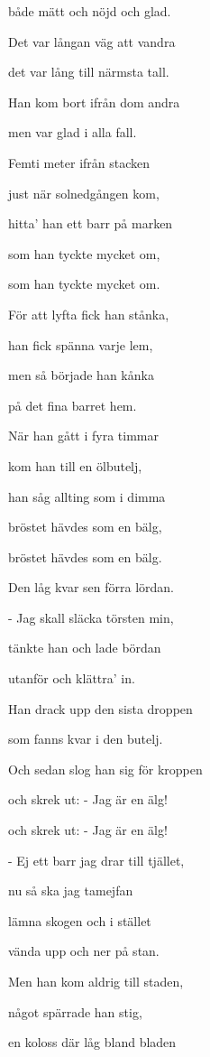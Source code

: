 både mätt och nöjd och glad.\bigskip



Det var långan väg att vandra

det var lång till närmsta tall.

Han kom bort ifrån dom andra

men var glad i alla fall.

Femti meter ifrån stacken

just när solnedgången kom,

hitta' han ett barr på marken

som han tyckte mycket om,

som han tyckte mycket om.\bigskip



För att lyfta fick han stånka,

han fick spänna varje lem,

men så började han kånka

på det fina barret hem.

När han gått i fyra timmar

kom han till en ölbutelj,

han såg allting som i dimma

bröstet hävdes som en bälg,

bröstet hävdes som en bälg.\bigskip



Den låg kvar sen förra lördan.

- Jag skall släcka törsten min,

tänkte han och lade bördan

utanför och klättra' in.

Han drack upp den sista droppen

som fanns kvar i den butelj.

Och sedan slog han sig för kroppen

och skrek ut: - Jag är en älg!

och skrek ut: - Jag är en älg!\bigskip



- Ej ett barr jag drar till tjället,

nu så ska jag tamejfan

lämna skogen och i stället

vända upp och ner på stan.

Men han kom aldrig till staden,

något spärrade han stig,

en koloss där låg bland bladen

